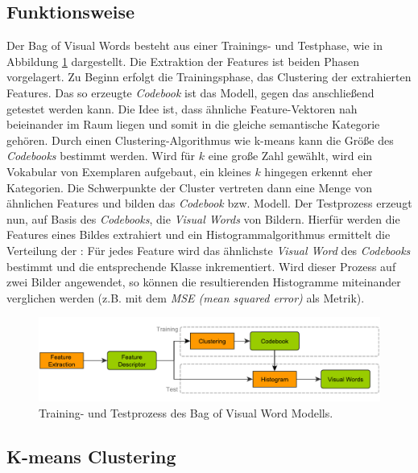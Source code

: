 \subsection{Funktionsweise}

Der Bag of Visual Words besteht aus einer Trainings- und Testphase, wie in Abbildung \ref{img:bovw} dargestellt. Die Extraktion der Features ist beiden Phasen vorgelagert.\newline
Zu Beginn erfolgt die Trainingsphase, das Clustering der extrahierten Features. Das so erzeugte \textit{Codebook} ist das Modell, gegen das anschließend getestet werden kann. Die Idee ist, dass ähnliche Feature-Vektoren nah beieinander im Raum liegen und somit in die gleiche semantische Kategorie gehören. Durch einen Clustering-Algorithmus wie k-means kann die Größe des \textit{Codebooks} bestimmt werden. Wird für $k$ eine große Zahl gewählt, wird ein Vokabular von Exemplaren aufgebaut, ein kleines $k$ hingegen erkennt eher Kategorien. Die Schwerpunkte der Cluster vertreten dann eine Menge von ähnlichen Features und bilden das \textit{Codebook} bzw. Modell.\newline
Der Testprozess erzeugt nun, auf Basis des \textit{Codebooks}, die \textit{Visual Words} von Bildern. Hierfür werden die Features eines Bildes extrahiert und ein Histogrammalgorithmus ermittelt die Verteilung der : Für jedes Feature wird das ähnlichste \textit{Visual Word} des \textit{Codebooks} bestimmt und die entsprechende Klasse inkrementiert. Wird dieser Prozess auf zwei Bilder angewendet, so können die resultierenden Histogramme miteinander verglichen werden (z.B. mit dem \textit{MSE (mean squared error)} als Metrik).

\begin{figure}
	\centering
	\includegraphics[scale=0.65]{images/bovw_process.pdf}
	\caption{Training- und Testprozess des Bag of Visual Word Modells.}
	\label{img:bovw}
\end{figure}

\subsection{K-means Clustering}

